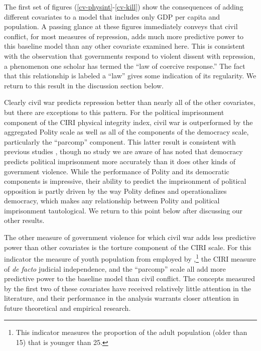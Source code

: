 \documentclass[12pt]{article}
\begin{document}
The first set of figures (\ref{cv-physint}-\ref{cv-kill}) show the consequences of adding different covariates to a model that includes only GDP per capita and population. A passing glance at these figures immediately conveys that civil conflict, for most measures of repression, adds much more predictive power to this baseline model than any other covariate examined here. This is consistent with the observation that governments respond to violent dissent with repression, a phenomenon one scholar \citep{Davenport2007AR} has termed the ``law of coercive response.'' The fact that this relationship is labeled a ``law'' gives some indication of its regularity. We return to this result in the discussion section below. 

Clearly civil war predicts repression better than nearly all of the other covariates, but there are exceptions to this pattern. For the political imprisonment component of the CIRI physical integrity index, civil war is outperformed by the aggregated Polity scale as well as all of the components of the democracy scale, particularly the ``parcomp'' component. This latter result is consistent with previous studies \citep{Keith2002PRQ,BDMetal2005}, though no study we are aware of has noted that democracy predicts political imprisonment more accurately than it does other kinds of government violence. While the performance of Polity and its democratic components is impressive, their ability to predict the imprisonment of political opposition is partly driven by the way Polity defines and operationalizes democracy, which makes any relationship between Polity and political imprisonment tautological. We return to this point below after discussing our other results.

The other measure of government violence for which civil war adds less predictive power than other covariates is the torture component of the CIRI scale. For this indicator the measure of youth population from \citet{Urdal2006} employed by \citet{NordaasDavenport2013},\footnote{This indicator measures the proportion of the adult population (older than 15) that is younger than 25.} the CIRI measure of {\it de facto} judicial independence, and the ``parcomp'' scale all add more predictive power to the baseline model than civil conflict. The concepts measured by the first two of these covariates have received relatively little attention in the literature, and their performance in the analysis warrants closer attention in future theoretical and empirical research. 
 
\end{document}
